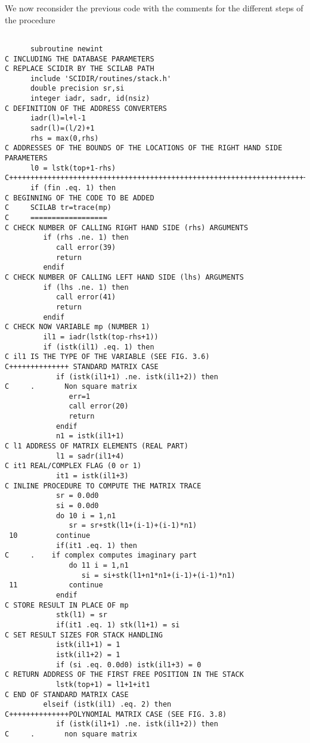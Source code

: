 We now reconsider the previous code with the comments for the different steps
of the procedure 

\begin{verbatim}

      subroutine newint
C INCLUDING THE DATABASE PARAMETERS 
C REPLACE SCIDIR BY THE SCILAB PATH   
      include 'SCIDIR/routines/stack.h'
      double precision sr,si
      integer iadr, sadr, id(nsiz)
C DEFINITION OF THE ADDRESS CONVERTERS
      iadr(l)=l+l-1
      sadr(l)=(l/2)+1
      rhs = max(0,rhs)
C ADDRESSES OF THE BOUNDS OF THE LOCATIONS OF THE RIGHT HAND SIDE PARAMETERS
      l0 = lstk(top+1-rhs)
C+++++++++++++++++++++++++++++++++++++++++++++++++++++++++++++++++++++++++++
      if (fin .eq. 1) then
C BEGINNING OF THE CODE TO BE ADDED
C     SCILAB tr=trace(mp)
C     ==================
C CHECK NUMBER OF CALLING RIGHT HAND SIDE (rhs) ARGUMENTS
         if (rhs .ne. 1) then
            call error(39)
            return
         endif
C CHECK NUMBER OF CALLING LEFT HAND SIDE (lhs) ARGUMENTS
         if (lhs .ne. 1) then
            call error(41)
            return
         endif
C CHECK NOW VARIABLE mp (NUMBER 1)
         il1 = iadr(lstk(top-rhs+1))
         if (istk(il1) .eq. 1) then
C il1 IS THE TYPE OF THE VARIABLE (SEE FIG. 3.6)
C++++++++++++++ STANDARD MATRIX CASE
            if (istk(il1+1) .ne. istk(il1+2)) then
C     .       Non square matrix
               err=1
               call error(20)
               return
            endif
            n1 = istk(il1+1)
C l1 ADDRESS OF MATRIX ELEMENTS (REAL PART)
            l1 = sadr(il1+4)
C it1 REAL/COMPLEX FLAG (0 or 1)
            it1 = istk(il1+3)
C INLINE PROCEDURE TO COMPUTE THE MATRIX TRACE     
            sr = 0.0d0
            si = 0.0d0
            do 10 i = 1,n1
               sr = sr+stk(l1+(i-1)+(i-1)*n1)
 10         continue
            if(it1 .eq. 1) then
C     .    if complex computes imaginary part 
               do 11 i = 1,n1
                  si = si+stk(l1+n1*n1+(i-1)+(i-1)*n1)
 11            continue
            endif
C STORE RESULT IN PLACE OF mp     
            stk(l1) = sr
            if(it1 .eq. 1) stk(l1+1) = si
C SET RESULT SIZES FOR STACK HANDLING
            istk(il1+1) = 1
            istk(il1+2) = 1
            if (si .eq. 0.0d0) istk(il1+3) = 0    
C RETURN ADDRESS OF THE FIRST FREE POSITION IN THE STACK
            lstk(top+1) = l1+1+it1
C END OF STANDARD MATRIX CASE
         elseif (istk(il1) .eq. 2) then
C++++++++++++++POLYNOMIAL MATRIX CASE (SEE FIG. 3.8)
            if (istk(il1+1) .ne. istk(il1+2)) then
C     .       non square matrix

\end{verbatim}
